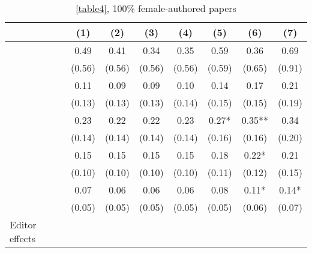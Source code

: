 \begin{table}[H]
    \footnotesize
    \centering
    \begin{threeparttable}
        \caption{\autoref{table4}, 100\% female-authored papers}
        \label{tableC4a}
        \begin{tabular}{p{2.64cm}S@{}S@{}S@{}S@{}S@{}S@{}S@{}}
            \toprule
            &{(1)}&{(2)}&{(3)}&{(4)}&{(5)}&{(6)}&{(7)}\\
            \midrule
            &        0.49   &        0.41   &        0.34   &        0.35   &        0.59   &        0.36   &        0.69   \\
                                          &      (0.56)   &      (0.56)   &      (0.56)   &      (0.56)   &      (0.59)   &      (0.65)   &      (0.91)   \\
                &        0.11   &        0.09   &        0.09   &        0.10   &        0.14   &        0.17   &        0.21   \\
                                          &      (0.13)   &      (0.13)   &      (0.13)   &      (0.14)   &      (0.15)   &      (0.15)   &      (0.19)   \\
                   &        0.23   &        0.22   &        0.22   &        0.23   &        0.27*  &        0.35** &        0.34   \\
                                          &      (0.14)   &      (0.14)   &      (0.14)   &      (0.14)   &      (0.16)   &      (0.16)   &      (0.20)   \\
                          &        0.15   &        0.15   &        0.15   &        0.15   &        0.18   &        0.22*  &        0.21   \\
                                          &      (0.10)   &      (0.10)   &      (0.10)   &      (0.10)   &      (0.11)   &      (0.12)   &      (0.15)   \\
                    &        0.07   &        0.06   &        0.06   &        0.06   &        0.08   &        0.11*  &        0.14*  \\
                                          &      (0.05)   &      (0.05)   &      (0.05)   &      (0.05)   &      (0.05)   &      (0.06)   &      (0.07)   \\
            \midrule
            Editor effects                &           {}   &           {}   &           {}   &           {}   &           {}   &           {}   &           {}   \\

\end{tabular}
\end{threeparttable}
\end{table}
